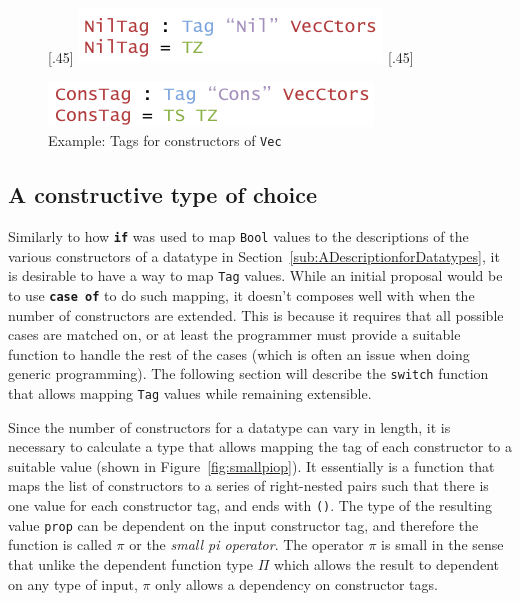 \documentclass{ituthesis}
\newcommand{\ttconstructor}[1]{\textcolor{constructor-color}{\texttt{#1}}}
\newcommand{\tttype}[1]{\textcolor{type-color}{\texttt{#1}}}
\newcommand{\ttdec}[1]{\textcolor{declared-var-color}{\texttt{#1}}}
\newcommand{\ttvar}[1]{\textcolor{local-var-color}{\texttt{#1}}}
\begin{document}
\begin{figure}[ht]
\begin{center}
  \subcaptionbox{Tag for \ttconstructor{Nil}\label{fig:vecctornil}}[.45\textwidth]{
    \includegraphics[scale=0.5]{Figures/VectorNilTag.png}
}
\subcaptionbox{Tag for \ttconstructor{Cons}\label{fig:vecctorcons}}[.45\textwidth]{
    \includegraphics[scale=0.5]{Figures/VectorConsTag.png}

}
\caption{Example: Tags for constructors of \tttype{Vec}}
\label{fig:vecctor}
\end{center}
\end{figure}


\subsection{A constructive type of choice}
\label{sub:AConstructiveTypeofChoice}
Similarly to how \texttt{\textbf{if}} was used to map \tttype{Bool} values to the descriptions of the various constructors of a datatype in Section~\ref{sub:ADescriptionforDatatypes}, it is desirable to have a way
to map \tttype{Tag} values. While an initial proposal would be to use \texttt{\textbf{case of}} to do such mapping, it doesn't composes well with when the number of constructors are extended.
This is because it requires that all possible cases are matched on, or at least the programmer must provide a suitable function to handle the rest of the cases (which is often an issue when doing generic programming).
The following section will describe the \ttdec{switch} function that allows mapping \tttype{Tag} values while remaining extensible.

Since the number of constructors for a datatype can vary in length, it is necessary to calculate a type that allows mapping the tag of each constructor to a suitable value (shown in Figure~\ref{fig:smallpiop}). 
It essentially is a function that maps the list of constructors to a series of right-nested pairs such that there is one value for each constructor tag, and ends with \tttype{()}.
The type of the resulting value \ttvar{prop} can be dependent on the input constructor tag, and therefore the function is called $\pi$ or the \textit{small pi operator}.
The operator $\pi$ is small in the sense that unlike the dependent function type $\Pi$ which allows the result to dependent on any type of input, $\pi$ only allows a dependency on constructor tags.
\end{document}
